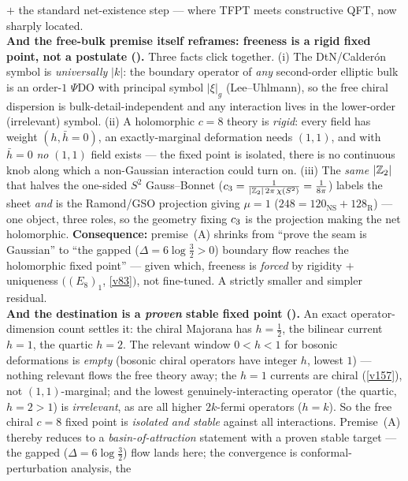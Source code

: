 \begin{keybox}
$+$ the standard net-existence step --- where TFPT meets constructive QFT, now sharply located.
\smallskip\\
\noindent\textbf{And the free-bulk premise itself reframes: freeness is a rigid fixed point, not a postulate
().} Three facts click together. (i) The DtN/Calder\'on symbol is
\emph{universally} $|k|$: the boundary operator of \emph{any} second-order elliptic bulk is an order-$1$
$\Psi$DO with principal symbol $|\xi|_g$ (Lee--Uhlmann), so the free chiral dispersion is
bulk-detail-independent and any interaction lives in the lower-order (irrelevant) symbol. (ii) A holomorphic
$c{=}8$ theory is \emph{rigid}: every field has weight $(h,\bar h{=}0)$, an exactly-marginal deformation
needs $(1,1)$, and with $\bar h{=}0$ \emph{no} $(1,1)$ field exists --- the fixed point is isolated, there is
no continuous knob along which a non-Gaussian interaction could turn on. (iii) The \emph{same} $|\mathbb Z_2|$ that
halves the one-sided $S^2$ Gauss--Bonnet ($c_3=\tfrac1{|\mathbb Z_2|\,2\pi\,\chi(S^2)}=\tfrac1{8\pi}$) labels
the sheet \emph{and} is the Ramond/GSO projection giving $\mu{=}1$ ($248{=}120_{\mathrm{NS}}{+}128_{\mathrm
R}$) --- one object, three roles, so the geometry fixing $c_3$ is the projection making the net
holomorphic. \textbf{Consequence:} premise~(A) shrinks from ``prove the seam is Gaussian'' to ``the gapped
($\Delta{=}6\log\tfrac32{>}0$) boundary flow reaches the holomorphic fixed point'' --- given which, freeness
is \emph{forced} by rigidity $+$ uniqueness $((E_8)_1$, \vref{v83}$)$, not fine-tuned. A strictly smaller and
simpler residual.
\smallskip\\
\noindent\textbf{And the destination is a \emph{proven} stable fixed point ().}
An exact operator-dimension count settles it: the chiral Majorana has $h{=}\tfrac12$, the bilinear current
$h{=}1$, the quartic $h{=}2$. The relevant window $0<h<1$ for bosonic deformations is \emph{empty} (bosonic
chiral operators have integer $h$, lowest $1$) --- nothing relevant flows the free theory away; the $h{=}1$
currents are chiral (\vref{v157}), not $(1,1)$-marginal; and the lowest genuinely-interacting operator (the
quartic, $h{=}2{>}1$) is \emph{irrelevant}, as are all higher $2k$-fermi operators ($h{=}k$). So the free
chiral $c{=}8$ fixed point is \emph{isolated and stable} against all interactions. Premise~(A) thereby
reduces to a \emph{basin-of-attraction} statement with a proven stable target --- the gapped
($\Delta{=}6\log\tfrac32$) flow lands here; the convergence is conformal-perturbation analysis, the

\end{keybox}
